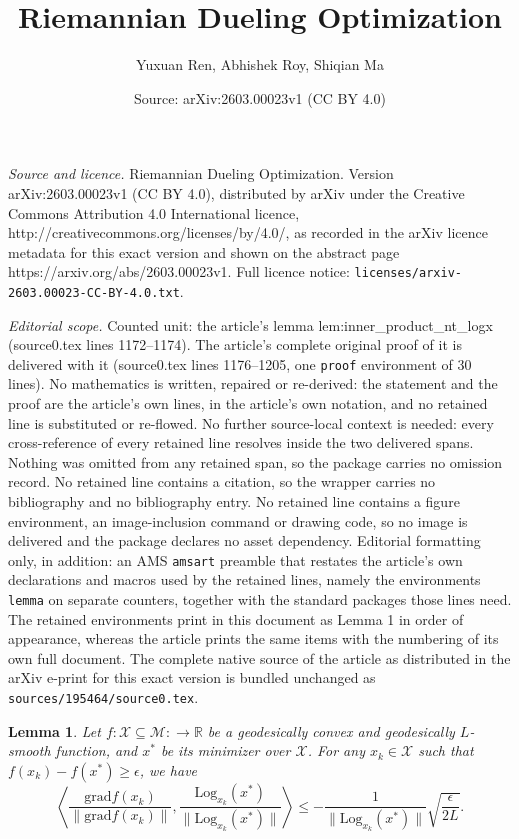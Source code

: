 \documentclass[10pt,a4paper]{amsart}
\title{Riemannian Dueling Optimization}
\author{Yuxuan Ren, Abhishek Roy, Shiqian Ma}
\date{Source: arXiv:2603.00023v1 (CC BY 4.0)}
\newtheorem{lemma}{Lemma}
\newcommand{\Log}{\mathrm{Log}}
\newcommand{\rgrad}{\mathrm{grad}}
\begin{document}
\maketitle

\noindent\emph{Source and licence.} Riemannian Dueling Optimization. Version arXiv:2603.00023v1 (CC BY 4.0), distributed by arXiv under the Creative Commons Attribution 4.0 International licence, http://creativecommons.org/licenses/by/4.0/, as recorded in the arXiv licence metadata for this exact version and shown on the abstract page https://arxiv.org/abs/2603.00023v1. Full licence notice: \texttt{licenses/arxiv-2603.00023-CC-BY-4.0.txt}.\par\smallskip

\noindent\textit{Editorial scope.} Counted unit: the article's lemma lem:inner\_product\_nt\_logx (source0.tex lines 1172--1174). The article's complete original proof of it is delivered with it (source0.tex lines 1176--1205, one \texttt{proof} environment of 30 lines). No mathematics is written, repaired or re-derived: the statement and the proof are the article's own lines, in the article's own notation, and no retained line is substituted or re-flowed.  No further source-local context is needed: every cross-reference of every retained line resolves inside the two delivered spans.  Nothing was omitted from any retained span, so the package carries no omission record.  No retained line contains a citation, so the wrapper carries no bibliography and no bibliography entry.  No retained line contains a figure environment, an image-inclusion command or drawing code, so no image is delivered and the package declares no asset dependency.  Editorial formatting only, in addition: an AMS \texttt{amsart} preamble that restates the article's own declarations and macros used by the retained lines, namely the environments \texttt{lemma} on separate counters, together with the standard packages those lines need.  The retained environments print in this document as Lemma 1 in order of appearance, whereas the article prints the same items with the numbering of its own full document.  The complete native source of the article as distributed in the arXiv e-print for this exact version is bundled unchanged as \texttt{sources/195464/source0.tex}.
\begin{lemma}\label{lem:inner_product_nt_logx}
Let $f:\mathcal{X}\subseteq\mathcal{M}:\rightarrow\mathbb{R}$ be a geodesically convex and geodesically ${L}$-smooth function, and $x^*$ be its minimizer over $\mathcal{X}$. For any $x_k\in\mathcal{X}$ such that $f(x_k)-f(x^*)\geq\epsilon$, we have $$\left\langle \frac{\rgrad f (x_k)}{\|\rgrad f(x_k)\|}, \frac{\Log_{x_k}(x^*)}{\|\Log_{x_k}(x^*)\|} \right\rangle \leq -\frac{1}{\|\Log_{x_k}(x^*)\|}\sqrt{\frac{ \epsilon}{2{L}}}.$$
\end{lemma}
\end{document}
